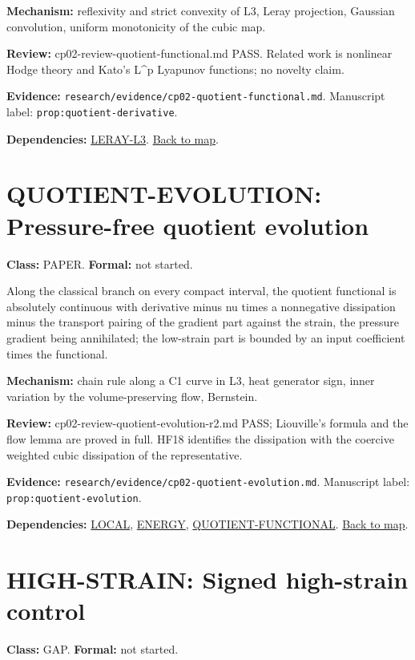 \documentclass[10pt]{article}
\begin{document}
\textbf{Mechanism:} reflexivity and strict convexity of L3, Leray projection, Gaussian convolution, uniform monotonicity of the cubic map.

\textbf{Review:} cp02-review-quotient-functional.md PASS. Related work is nonlinear Hodge theory and Kato's L\textasciicircum{}p Lyapunov functions; no novelty claim.

\textbf{Evidence:} \texttt{research/evidence/cp02-quotient-functional.md}. Manuscript label: \texttt{prop:quotient-derivative}.

\textbf{Dependencies:} \hyperref[node:LERAY-L3]{LERAY-L3}. \hyperref[map]{Back to map}.

\section*{QUOTIENT-EVOLUTION: Pressure-free quotient evolution}\label{node:QUOTIENT-EVOLUTION}
\textbf{Class:} PAPER. \textbf{Formal:} not started.

Along the classical branch on every compact interval, the quotient functional is absolutely continuous with derivative minus nu times a nonnegative dissipation minus the transport pairing of the gradient part against the strain, the pressure gradient being annihilated; the low-strain part is bounded by an input coefficient times the functional.

\textbf{Mechanism:} chain rule along a C1 curve in L3, heat generator sign, inner variation by the volume-preserving flow, Bernstein.

\textbf{Review:} cp02-review-quotient-evolution-r2.md PASS; Liouville's formula and the flow lemma are proved in full. HF18 identifies the dissipation with the coercive weighted cubic dissipation of the representative.

\textbf{Evidence:} \texttt{research/evidence/cp02-quotient-evolution.md}. Manuscript label: \texttt{prop:quotient-evolution}.

\textbf{Dependencies:} \hyperref[node:LOCAL]{LOCAL}, \hyperref[node:ENERGY]{ENERGY}, \hyperref[node:QUOTIENT-FUNCTIONAL]{QUOTIENT-FUNCTIONAL}. \hyperref[map]{Back to map}.

\section*{HIGH-STRAIN: Signed high-strain control}\label{node:HIGH-STRAIN}
\textbf{Class:} GAP. \textbf{Formal:} not started.
\end{document}
